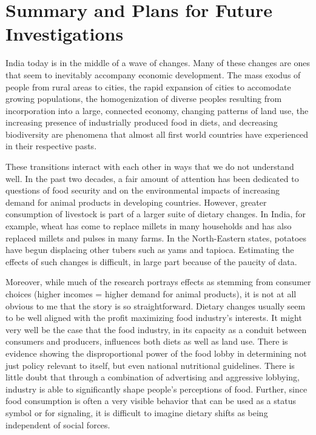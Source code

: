 \documentclass[report.tex]{subfiles}
\begin{document}
\chapter{Summary and Plans for Future Investigations}

India today is in the middle of a wave of changes. Many of these changes are ones that seem to inevitably accompany economic development. The mass exodus of people from rural areas to cities, the rapid expansion of cities to accomodate growing populations, the homogenization of diverse peoples resulting from incorporation into a large, connected economy, changing patterns of land use, the increasing presence of industrially produced food in diets, and decreasing biodiversity are phenomena that almost all first world countries have experienced in their respective pasts.

These transitions interact with each other in ways that we do not understand well. In the past two decades, a fair amount of attention has been dedicated to questions of food security and on the environmental impacts of increasing demand for animal products in developing countries. However, greater consumption of livestock is part of a larger suite of dietary changes. In India, for example, wheat has come to replace millets in many households and has also replaced millets and pulses in many farms. In the North-Eastern states, potatoes have begun displacing other tubers such as yams and tapioca. Estimating the effects of such changes is difficult, in large part because of the paucity of data.

Moreover, while much of the research portrays effects as stemming from consumer choices (higher incomes = higher demand for animal products), it is not at all obvious to me that the story is so straightforward. Dietary changes usually seem to be well aligned with the profit maximizing food industry's interests. It might very well be the case that the food industry, in its capacity as a conduit between consumers and producers, influences both diets as well as land use. There is evidence showing the disproportional power of the food lobby in determining not just policy relevant to itself, but even national nutritional guidelines. There is little doubt that through a combination of advertising and aggressive lobbying, industry is able to significantly shape people's perceptions of food. Further, since food consumption is often a very visible behavior that can be used as a status symbol or for signaling, it is difficult to imagine dietary shifts as being independent of social forces.
\end{document}
